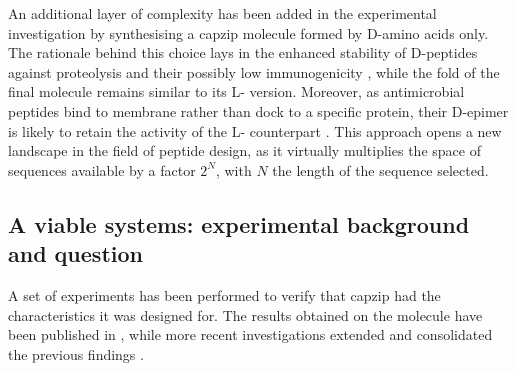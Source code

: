 An additional layer of complexity has been added in the experimental investigation by synthesising a capzip molecule formed by D-amino acids only. The rationale behind this choice lays in the enhanced stability of D-peptides against proteolysis and their possibly low immunogenicity \citep{Uppalapati2016,Arranz-Gibert2018,King1994}, while the fold of the final molecule remains similar to its L- version.
%
Moreover, as antimicrobial peptides bind to membrane rather than dock to a specific protein, their D-epimer is likely to retain the activity of the L- counterpart \citep{King1994,Bland2001}.
%
This approach opens a new landscape in the field of peptide design, as it virtually multiplies the space of sequences available by a factor $2^N$, with $N$ the length of the sequence selected.


\subsection{A viable systems: experimental background and question}
A set of experiments has been performed to verify that capzip had the characteristics it was designed for. The results obtained on the molecule have been published in \citet{Castelletto2016}, while more recent investigations extended and consolidated the previous findings \citep{Kepiro2019}.

